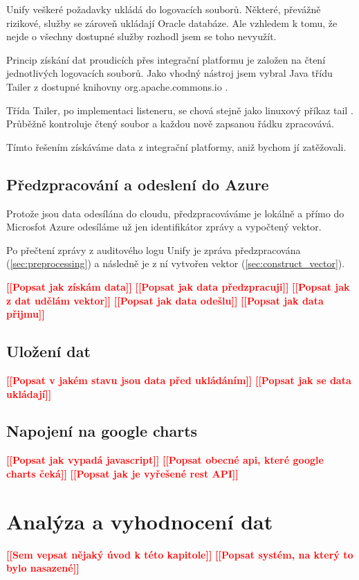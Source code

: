 \documentclass[thesis=M,czech]{FITthesis}[2012/10/20]
\newcommand{\todo}[1]{\textcolor{red}{\textbf{[[#1]]}}}
\newcommand{\blind}[1][1]{\textcolor{gray}{\Blindtext[#1][1]}}
\begin{document}
		Unify veškeré požadavky ukládá do logovacích souborů. Některé, převážně rizikové, služby se zároveň ukládají Oracle databáze. Ale vzhledem k tomu, že nejde o všechny dostupné služby rozhodl jsem se toho nevyužít.
		
		Princip získání dat proudicích přes integrační platformu je založen na čtení jednotlivých logovacích souborů. Jako vhodný nástroj jsem vybral Java třídu Tailer z dostupné knihovny org.apache.commons.io \cite{tailerClass}.
		
		Třída Tailer, po implementaci listeneru, se chová stejně jako linuxový příkaz tail \cite{tailLinux}. Průběžně kontroluje čtený soubor a každou nově zapsanou řádku zpracovává.
		
		Tímto řešením získáváme data z integrační platformy, aniž bychom jí zatěžovali. 
	\section{Předzpracování a odeslení do Azure}
		Protože jsou data odesílána do cloudu, předzpracováváme je lokálně a přímo do Microsfot Azure odesíláme už jen identifikátor zprávy a vypočtený vektor.
		
		Po přečtení zprávy z auditového logu Unify je zpráva předzpracována (\ref{sec:preprocessing}) a následně je z ní vytvořen vektor (\ref{sec:construct_vector}).
		
		\todo{Popsat jak získám data}
		\blind[1]
		\todo{Popsat jak data předzpracuji}
		\blind[1]
		\todo{Popsat jak z dat udělám vektor}
		\blind[1]
		\todo{Popsat jak data odešlu}
		\blind[1]
		\todo{Popsat jak data přijmu}
		\blind[1]			
		
	\section{Uložení dat}
		\todo{Popsat v jakém stavu jsou data před ukládáním}
		\todo{Popsat jak se data ukládají}					
		\blind[2]
		
	\section{Napojení na google charts}
		\todo{Popsat jak vypadá javascript}
		\blind[1]
		\todo{Popsat obecné api, které google charts čeká}
		\blind[1]
		\todo{Popsat jak je vyřešené rest API}				
		\blind[1]

\chapter{Analýza a vyhodnocení dat}
	\todo{Sem vepsat nějaký úvod k této kapitole}
	\blind[1]
	\todo{Popsat systém, na který to bylo nasazené}
	\blind[1]
\end{document}
